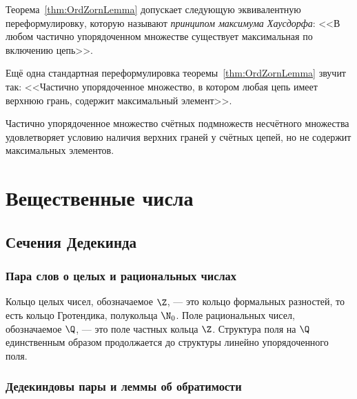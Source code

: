 \documentclass[
	extrafontsizes,
	11pt,
	hyphens,
]{memoir}
\begin{document}
\begin{observation}
Теорема~\ref{thm:OrdZornLemma} допускает следующую эквивалентную переформулировку,
которую называют
\emph{принципом максимума Хаусдорфа}: <<В любом частично упорядоченном множестве существует максимальная по включению цепь>>.
\end{observation}


\begin{remark}
Ещё одна стандартная переформулировка теоремы~\ref{thm:OrdZornLemma} звучит так: <<Частично упорядоченное множество, в котором любая цепь имеет верхнюю грань, содержит максимальный элемент>>.
\end{remark}

\begin{example}
Частично упорядоченное множество счётных подмножеств несчётного множества удовлетворяет условию наличия верхних граней у счётных цепей, но не содержит максимальных элементов.
\end{example}



\chapter{Вещественные числа}


\section{Сечения Дедекинда}

\subsection{Пара слов о целых и рациональных числах}

Кольцо целых чисел, обозначаемое \(\Z\), --- это кольцо формальных разностей, то есть кольцо Гротендика, полукольца \(\N_0\).
Поле рациональных чисел, обозначаемое \(\Q\), --- это поле частных кольца \(\Z\).
Структура поля на \(\Q\) единственным образом продолжается до структуры линейно упорядоченного поля.

\subsection{Дедекиндовы пары и леммы об обратимости}

\end{document}
